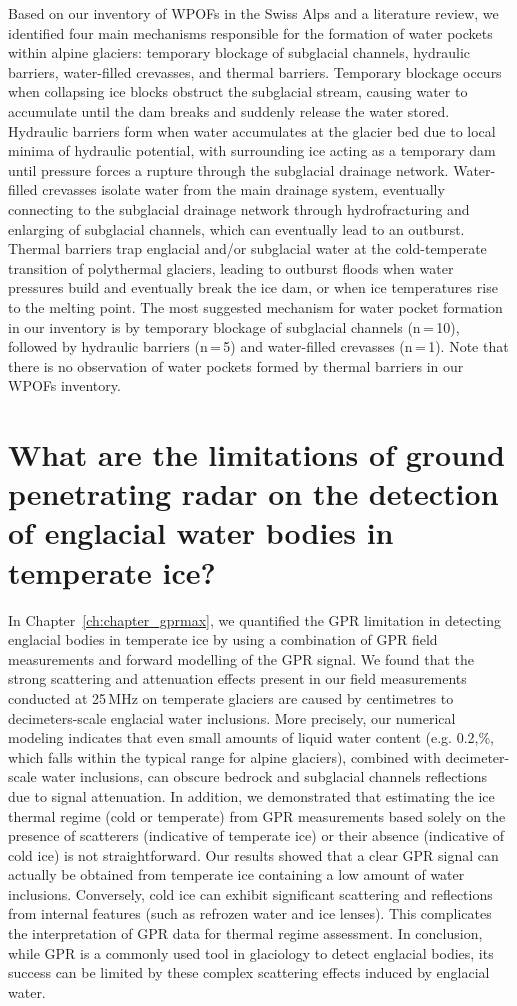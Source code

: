Based on our inventory of WPOFs in the Swiss Alps and a literature review, we identified four main mechanisms responsible for the formation of water pockets within alpine glaciers: temporary blockage of subglacial channels, hydraulic barriers, water-filled crevasses, and thermal barriers. Temporary blockage occurs when collapsing ice blocks obstruct the subglacial stream, causing water to accumulate until the dam breaks and suddenly release the water stored. Hydraulic barriers form when water accumulates at the glacier bed due to local minima of hydraulic potential, with surrounding ice acting as a temporary dam until pressure forces a rupture through the subglacial drainage network. Water-filled crevasses isolate water from the main drainage system, eventually connecting to the subglacial drainage network through hydrofracturing and enlarging of subglacial channels, which can eventually lead to an outburst. Thermal barriers trap englacial and/or subglacial water at the cold-temperate transition of polythermal glaciers, leading to outburst floods when water pressures build and eventually break the ice dam, or when ice temperatures rise to the melting point. The most suggested mechanism for water pocket formation in our inventory is by temporary blockage of subglacial channels (n\,=\,10), followed by hydraulic barriers (n\,=\,5) and water-filled crevasses (n\,=\,1). Note that there is no observation of water pockets formed by thermal barriers in our WPOFs inventory.  
%

\section{What are the limitations of ground penetrating radar on the detection of englacial water bodies in temperate ice?}

In Chapter~\ref{ch:chapter_gprmax}, we quantified the GPR limitation in detecting englacial bodies in temperate ice by using a combination of GPR field measurements and forward modelling of the GPR signal. We found that the strong scattering and attenuation effects present in our field measurements conducted at 25\,MHz on temperate glaciers are caused by centimetres to decimeters-scale englacial water inclusions. More precisely, our numerical modeling indicates that even small amounts of liquid water content (e.g. 0.2,\%, which falls within the typical range for alpine glaciers), combined with decimeter-scale water inclusions, can obscure bedrock and subglacial channels reflections due to signal attenuation. In addition, we demonstrated that estimating the ice thermal regime (cold or temperate) from GPR measurements based solely on the presence of scatterers (indicative of temperate ice) or their absence (indicative of cold ice) is not straightforward. Our results showed that a clear GPR signal can actually be obtained from temperate ice containing a low amount of water inclusions. Conversely, cold ice can exhibit significant scattering and reflections from internal features (such as refrozen water and ice lenses). This complicates the interpretation of GPR data for thermal regime assessment. In conclusion, while GPR is a commonly used tool in glaciology to detect englacial bodies, its success can be limited by these complex scattering effects induced by englacial water. 

